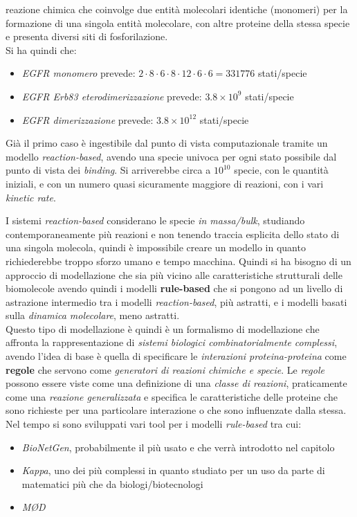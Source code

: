 \documentclass[a4paper,12pt, oneside]{book}
\begin{document}
\begin{esempio}
  reazione chimica che coinvolge due entità molecolari identiche (monomeri) per
  la formazione di una singola entità molecolare, con altre proteine della
  stessa specie e presenta diversi siti di fosforilazione. \\
  Si ha quindi che:
  \begin{itemize}
    \item \textit{EGFR monomero} prevede: $2\cdot 8\cdot 6\cdot 8\cdot 12\cdot
    6\cdot 6=331776$ stati/specie 
    \item \textit{EGFR Erb83 eterodimerizzazione} prevede: $3.8\times 10^9$
    stati/specie
    \item \textit{EGFR dimerizzazione} prevede: $3.8\times 10^{12}$
    stati/specie
  \end{itemize}
  Già il primo caso è ingestibile dal punto di vista computazionale tramite un
  modello \textit{reaction-based}, avendo una specie univoca per ogni stato
  possibile dal punto di vista dei \textit{binding}. Si arriverebbe circa a
  $10^{10}$ specie, con le quantità iniziali, e con un numero quasi sicuramente
  maggiore di reazioni, con i vari \textit{kinetic rate}. 
\end{esempio}
I sistemi \textit{reaction-based} considerano le specie \textit{in massa/bulk},
studiando contemporaneamente più reazioni e non tenendo traccia esplicita dello
stato di una singola molecola, quindi è impossibile creare un modello in quanto
richiederebbe troppo sforzo umano e tempo macchina. Quindi si ha bisogno di un
approccio di modellazione che sia più vicino alle caratteristiche strutturali
delle biomolecole avendo quindi i modelli \textbf{rule-based} che si pongono ad
un livello di astrazione intermedio tra i modelli \textit{reaction-based}, più
astratti, e i modelli basati sulla \textit{dinamica molecolare}, meno
astratti.\\
Questo tipo di modellazione è quindi è un formalismo di modellazione che
affronta la rappresentazione di \textit{sistemi biologici combinatorialmente
  complessi}, avendo l'idea di base è quella di specificare le
\textit{interazioni proteina-proteina} come \textbf{regole} che servono come
\textit{generatori di reazioni chimiche e specie}. Le \textit{regole} possono
essere viste come una definizione di una \textit{classe di reazioni},
praticamente come una \textit{reazione generalizzata} e specifica le
caratteristiche delle proteine che sono richieste per una particolare
interazione o che sono influenzate dalla stessa.\\
Nel tempo si sono sviluppati vari tool per i modelli \textit{rule-based} tra
cui:
\begin{itemize}
  \item \textit{BioNetGen}, probabilmente il più usato e che verrà introdotto
  nel capitolo 
  \item \textit{Kappa}, uno dei più complessi in quanto studiato per un uso da
  parte di matematici più che da biologi/biotecnologi
  \item \textit{MØD}
\end{itemize}
\end{document}
